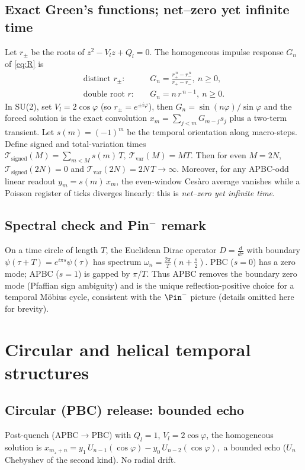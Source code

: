 \documentclass[11pt]{article}
\theoremstyle{definition}
\theoremstyle{remark}
\begin{document}
\subsection{Exact Green's functions; net--zero yet infinite time}
Let $r_\pm$ be the roots of $z^2-V_l z + Q_l=0$. The homogeneous impulse response $G_n$ of \eqref{eq:R} is
\begin{align}
\text{distinct }r_\pm:&\quad G_n=\frac{r_+^{\,n}-r_-^{\,n}}{r_+-r_-},\ n\ge 0,\\
\text{double root }r:&\quad G_n= n\, r^{\,n-1},\ n\ge 0.
\end{align}
In SU(2), set $V_l=2\cos\varphi$ (so $r_\pm=e^{\pm i\varphi}$), then $G_n=\sin(n\varphi)/\sin\varphi$ and the forced solution is the exact convolution $x_m=\sum_{j<m}G_{m-j}s_j$ plus a two-term transient.
Let $s(m)=(-1)^m$ be the temporal orientation along macro-steps. Define signed and total-variation times
\(
\mathcal{T}_{\mathrm{signed}}(M)=\sum_{m<M}s(m)\,T,\ 
\mathcal{T}_{\mathrm{var}}(M)=MT.
\)
Then for even $M=2N$, $\mathcal{T}_{\mathrm{signed}}(2N)=0$ and $\mathcal{T}_{\mathrm{var}}(2N)=2N\,T\to\infty$.
Moreover, for any APBC-odd linear readout $y_m=s(m)\,x_m$, the even-window Ces\`aro average vanishes while a Poisson register of ticks diverges linearly: this is \emph{net--zero yet infinite time}.

\subsection{Spectral check and Pin$^-$ remark}
On a time circle of length $T$, the Euclidean Dirac operator $D=\frac{d}{d\tau}$ with boundary $\psi(\tau{+}T)=e^{i\pi s}\psi(\tau)$ has spectrum $\omega_n=\frac{2\pi}{T}(n+\frac{s}{2})$. PBC ($s{=}0$) has a zero mode; APBC ($s{=}1$) is gapped by $\pi/T$. Thus APBC removes the boundary zero mode (Pfaffian sign ambiguity) and is the unique reflection-positive choice for a temporal M\"obius cycle, consistent with the $\Pin^-$ picture (details omitted here for brevity).

\section{Circular and helical temporal structures}
\subsection{Circular (PBC) release: bounded echo}
Post-quench (APBC$\to$PBC) with $Q_l=1$, $V_l=2\cos\varphi$, the homogeneous solution is
\(
x_{m_\star+n}=y_1\,U_{n-1}(\cos\varphi)-y_0\,U_{n-2}(\cos\varphi),
\)
a bounded echo (\(U_n\) Chebyshev of the second kind). No radial drift.
\end{document}
